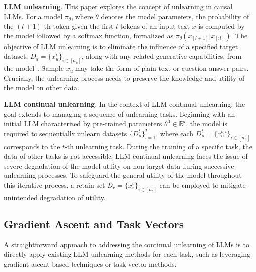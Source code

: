 \documentclass{article}
\theoremstyle{plain}
\theoremstyle{definition}
\theoremstyle{remark}
\begin{document}
\textbf{LLM unlearning}.
This paper explores the concept of unlearning in causal LLMs. For a model $\pi_{\theta}$, where $\theta$ denotes the model parameters, the probability of the $(l+1)$-th token given the first $l$ tokens of an input text $x$ is computed by the model followed by a softmax function, formalized as $\pi_{\theta}(x_{[l+1]}|x_{[:l]})$.
The objective of LLM unlearning is to eliminate the influence of a specified target dataset, $D_u=\{x_u^i\}_{i \in [n_u]}$, along with any related generative capabilities, from the model~\cite{DBLP:journals/corr/abs-2404-02062}. 
Sample $x_u$ may take the form of plain text or question-answer pairs.
Crucially, the unlearning process needs to preserve the knowledge and utility of the model on other data.

\textbf{LLM continual unlearning}. In the context of LLM continual unlearning, the goal extends to managing a sequence of unlearning tasks. Beginning with an initial LLM characterized by pre-trained parameters $\theta^0\in \mathbb{R}^d$, the model is required to sequentially unlearn datasets $\{D_u^t\}_{t=1}^T$, where each $D_u^t=\{x_u^{t,i}\}_{i\in{[n_u^t]}}$ corresponds to the $t$-th unlearning task.
During the training of a specific task, the data of other tasks is not accessible.
LLM continual unlearning faces the issue of severe degradation of the model utility on non-target data during successive unlearning processes.
To safeguard the general utility of the model throughout this iterative process, a retain set $D_r=\{x_r^i\}_{i\in [n_r]}$ can be employed to mitigate unintended degradation of utility.

\subsection{Gradient Ascent and Task Vectors}
\label{sec:preliminary_method}
A straightforward approach to addressing the continual unlearning of LLMs is to directly apply existing LLM unlearning methods for each task, such as leveraging gradient ascent-based techniques or task vector methods.
\end{document}
